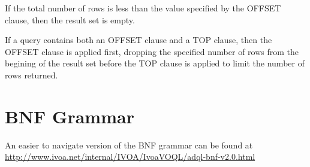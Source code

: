 \documentclass[11pt,a4paper]{ivoa}
\begin{document}
If the total number of rows is less than the value
specified by the OFFSET clause, then the result set is empty.

If a query contains both an OFFSET clause and a TOP clause,
then the OFFSET clause is applied first, dropping the specified
number of rows from the begining of the result set before the
TOP clause is applied to limit the number of rows returned.

\appendix
\section{BNF Grammar}
\label{sec:grammar}

An easier to navigate version of the BNF grammar can be found at\\
\url{http://www.ivoa.net/internal/IVOA/IvoaVOQL/adql-bnf-v2.0.html}
\end{document}
